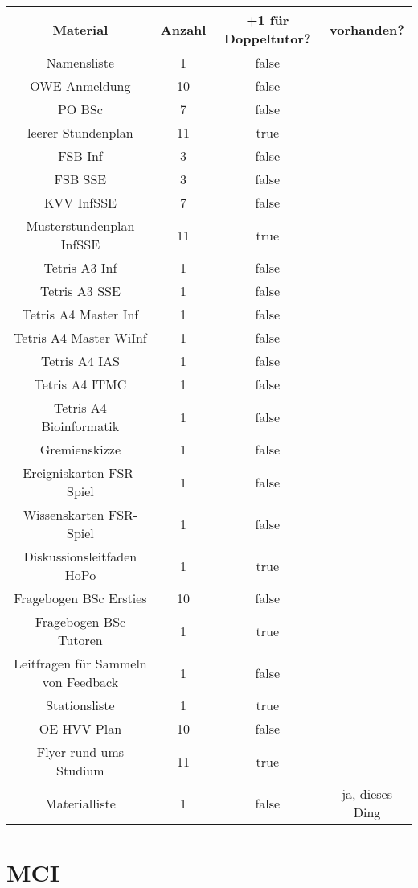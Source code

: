 \documentclass[10pt,a4paper,oneside,ngerman,numbers=noenddot]{scrartcl}
\begin{document}
	\begin{tabular}{c|c|c|c}
		\textbf{Material} & \textbf{Anzahl} & \textbf{+1 für Doppeltutor?} & \textbf{vorhanden?} \\
		\hline
		Namensliste & 1 & false & \\
		\hline
		OWE-Anmeldung & 10 & false & \\
		\hline
		PO BSc & 7 & false & \\
		\hline
		leerer Stundenplan & 11 & true & \\
		\hline
		FSB Inf & 3 & false & \\
		\hline
		FSB SSE & 3 & false & \\
		\hline
		KVV InfSSE & 7 & false & \\
		\hline
		Musterstundenplan InfSSE & 11 & true & \\
		\hline
		Tetris A3 Inf & 1 & false & \\
		\hline
		Tetris A3 SSE & 1 & false & \\
		\hline
		Tetris A4 Master Inf & 1 & false & \\
		\hline
		Tetris A4 Master WiInf & 1 & false & \\
		\hline
		Tetris A4 IAS & 1 & false & \\
		\hline
		Tetris A4 ITMC & 1 & false & \\
		\hline
		Tetris A4 Bioinformatik & 1 & false & \\
		\hline
		Gremienskizze & 1 & false & \\
		\hline
		Ereigniskarten FSR-Spiel & 1 & false & \\
		\hline
		Wissenskarten FSR-Spiel & 1 & false & \\
		\hline
		Diskussionsleitfaden HoPo & 1 & true & \\
		\hline
		Fragebogen BSc Ersties & 10 & false & \\
		\hline
		Fragebogen BSc Tutoren & 1 & true & \\
		\hline
		Leitfragen für Sammeln von Feedback & 1 & false & \\
		\hline
		Stationsliste & 1 & true & \\
		\hline
		OE HVV Plan & 10 & false & \\
		\hline
		Flyer rund ums Studium & 11 & true & \\
		\hline
		Materialliste & 1 & false & ja, dieses Ding \\
	\end{tabular}

\section{MCI}
\end{document}
